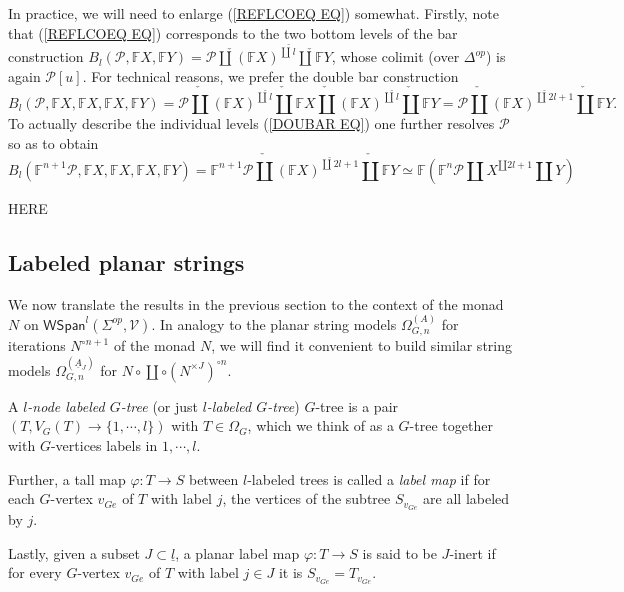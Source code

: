 \documentclass[a4paper,10pt]{article}%
\begin{document}
In practice, we will need to enlarge 
(\ref{REFLCOEQ EQ}) somewhat.
Firstly, note that (\ref{REFLCOEQ EQ})
corresponds to the two bottom levels of the bar construction
$B_l(\mathcal{P}, \mathbb{F} X, \mathbb{F} Y)=
\mathcal{P} \mathbin{\check{\amalg}}
(\mathbb{F} X)^{\check{\amalg} l} 
\mathbin{\check{\amalg}} \mathbb{F} Y$,
whose colimit (over $\Delta^{op}$) is again $\mathcal{P}[u]$.
For technical reasons, we prefer the double bar construction
\begin{equation}\label{DOUBAR EQ}
	B_l(\mathcal{P}, \mathbb{F} X, \mathbb{F} X, \mathbb{F} X, \mathbb{F} Y)
=
	\mathcal{P} \mathbin{\check{\amalg}}
	(\mathbb{F} X)^{\check{\amalg} l} 
	\mathbin{\check{\amalg}}
	\mathbb{F} X
	\mathbin{\check{\amalg}}
	(\mathbb{F} X)^{\check{\amalg} l} 
	\mathbin{\check{\amalg}} \mathbb{F} Y
=
	\mathcal{P} \mathbin{\check{\amalg}}
	(\mathbb{F} X)^{\check{\amalg} 2l+1} 
	\mathbin{\check{\amalg}} \mathbb{F} Y.
\end{equation}
To actually describe the individual levels 
(\ref{DOUBAR EQ}) one further resolves $\mathcal{P}$
so as to obtain
\[
	B_l(\mathbb{F}^{n+1}\mathcal{P}, \mathbb{F} X, \mathbb{F} X, \mathbb{F} X, \mathbb{F} Y)
=
	\mathbb{F}^{n+1}\mathcal{P} \mathbin{\check{\amalg}}
	(\mathbb{F} X)^{\check{\amalg} 2l+1} 
	\mathbin{\check{\amalg}} \mathbb{F} Y
\simeq
	\mathbb{F}\left(
		\mathbb{F}^{n} \mathcal{P} \amalg
		X^{\amalg 2l+1} \amalg Y
	\right)
\]



{\color{red} HERE}



\subsection{Labeled planar strings}\label{LABELSTRI SEC}

We now translate the results in the previous section to the context of the monad $N$ on $\mathsf{WSpan}^l(\Sigma^{op},\mathcal{V})$. In analogy to the planar string models $\Omega_{G,n}^{(A)}$ for iterations $N^{\circ n+1}$ of the monad $N$,
we will find it convenient to build similar string models
$\Omega_{G,n}^{(\underline{A}_J)}$ for 
$N \circ \coprod \circ (N^{\times J})^{\circ n}$.


\begin{definition}
A \textit{$l$-node labeled $G$-tree} (or just \textit{$l$-labeled $G$-tree}) $G$-tree is a pair $(T,V_G(T) \to \{1,\cdots,l\})$ with $T \in \Omega_G$, which we think of as a $G$-tree together with $G$-vertices labels in $1,\cdots,l$.

Further, a tall map $\varphi \colon T \to S$ between $l$-labeled trees is called a \textit{label map} if for each $G$-vertex $v_{G e}$ of $T$ with label $j$, the vertices of the subtree $S_{v_{G e}}$ are all labeled by $j$.

Lastly, given a subset $J\subset \underline{l}$, a planar label map $\varphi \colon T \to S$ is said to be $J$-inert if for every $G$-vertex $v_{G e}$ of $T$ with label $j \in J$ it is $S_{v_{Ge}} = T_{v_{Ge}}$.
\end{definition}
\end{document}
